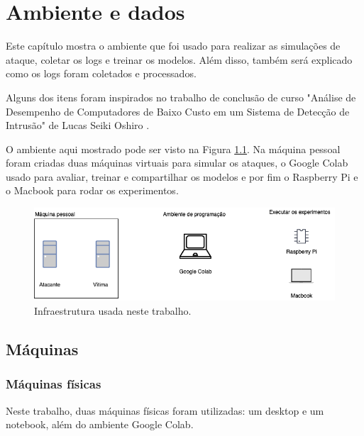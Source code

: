 
\chapter{Ambiente e dados}
\label{cap:data}

Este capítulo mostra o ambiente que foi usado para realizar as simulações de ataque,
coletar os logs e treinar os modelos. Além disso, também será explicado como os logs 
foram coletados e processados.

Alguns dos itens foram inspirados no trabalho de conclusão de curso "Análise de 
Desempenho de Computadores de Baixo Custo em um Sistema de Detecção de Intrusão" de 
Lucas Seiki Oshiro \cite{tcc:lucas}.

O ambiente aqui mostrado pode ser visto na Figura \ref{fig:arquitetura_total}. Na máquina pessoal foram 
criadas duas máquinas virtuais para simular os ataques, o Google Colab 
usado para avaliar, treinar e compartilhar os modelos e por fim o Raspberry Pi e o Macbook 
para rodar os experimentos.

\begin{figure}
    \centering
    \includegraphics[width=1\textwidth]{figuras/arquitetura_total.png}
    \caption{Infraestrutura usada neste trabalho. \label{fig:arquitetura_total}}
\end{figure}


\section{Máquinas}

\subsection{Máquinas físicas}

Neste trabalho, duas máquinas físicas foram utilizadas: um desktop e um notebook, além do ambiente Google Colab. 

